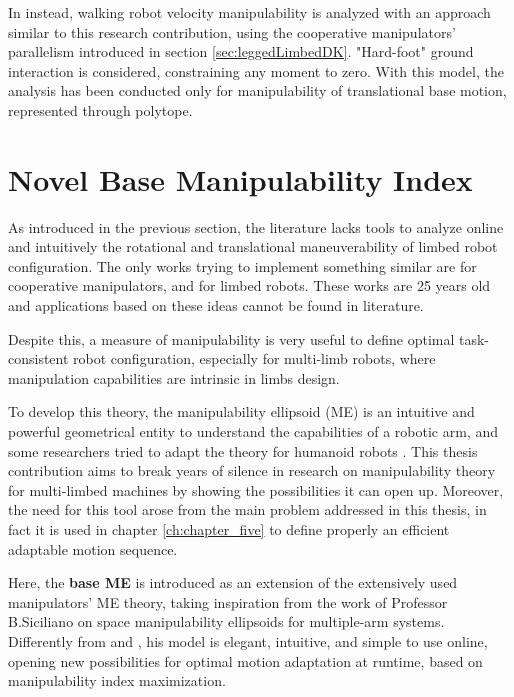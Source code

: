 In \cite{velocityWorkspacePolytope} instead, walking robot velocity manipulability is analyzed with an approach similar to this research contribution, using the cooperative manipulators' parallelism introduced in section \ref{sec:leggedLimbedDK}. "Hard-foot" ground interaction is considered, constraining any moment to zero. With this model, the analysis has been conducted only for manipulability of translational base motion, represented through polytope\cite{PolytopesManipulability}. 


\section{Novel Base Manipulability Index}
\label{sec:base_manipolability}

As introduced in the previous section, the literature lacks tools to analyze online and intuitively the rotational and translational maneuverability of limbed robot configuration.
The only works trying to implement something similar are \cite{DualArmTaskManipulability} \cite{MultiLimbManipulabilityMelchiorri} for cooperative manipulators, and \cite{velocityWorkspacePolytope} for limbed robots. 
These works are 25 years old and applications based on these ideas cannot be found in literature.

Despite this, a measure of manipulability is very useful to define optimal task-consistent robot configuration, especially for multi-limb robots, where manipulation capabilities are intrinsic in limbs design.

To develop this theory, the manipulability ellipsoid (ME) is an intuitive and powerful geometrical entity to understand the capabilities of a robotic arm\cite{ManipulabilityYoshikawa}, and some researchers tried to adapt the theory for humanoid robots
\cite{BipedEllipsoid1}\cite{BipedEllipsoid2}\cite{BipedEllipsoid3}\cite{BipedEllipsoid4}\cite{BipedEllipsoid5}. This thesis contribution aims to break years of silence in research on manipulability theory for multi-limbed machines by showing the possibilities it can open up. Moreover, the need for this tool arose from the main problem addressed in this thesis, in fact it is used in chapter \ref{ch:chapter_five} to define properly an efficient adaptable motion sequence. 


Here, the \textbf{base ME} is introduced as an extension of the extensively used manipulators' ME theory, taking inspiration from the work of Professor B.Siciliano on space manipulability ellipsoids for multiple-arm systems\cite{MultiArmManipulability}\cite{DualArmManipulability}. Differently from \cite{MultiLimbManipulabilityMelchiorri} and \cite{velocityWorkspacePolytope}, his model is elegant, intuitive, and simple to use online, opening new possibilities for optimal motion adaptation at runtime, based on manipulability index maximization. 

